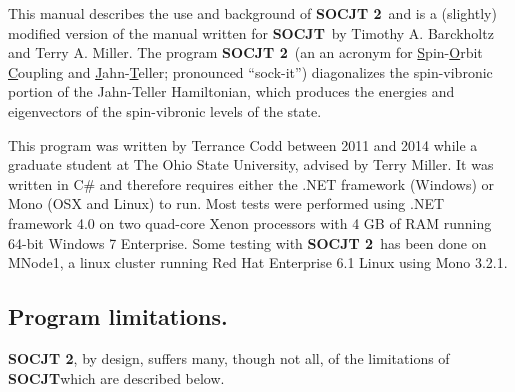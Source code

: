 \documentclass{article}
\newcommand{\ul}{\underline }
\newcommand{\socjttwo}{{\bf SOCJT 2}}
\newcommand{\socjt}{{\bf SOCJT}}
\newcommand{\socrt}{{\bf SOCRT}}
\begin{document}
This manual describes the use and background of \socjttwo\ and is a (slightly) modified version of the manual written for \socjt\ by Timothy A. Barckholtz and Terry A. Miller.
The program \socjttwo\ (an an acronym for {\ul S}pin-{\ul O}rbit {\ul C}oupling
and {\ul J}ahn-{\ul T}eller; pronounced ``sock-it'') diagonalizes the
spin-vibronic portion of the Jahn-Teller Hamiltonian, which produces
the energies and eigenvectors of the spin-vibronic levels of the
state.

\begin{comment}
Besides diagonalizing the spin-vibronic Hamiltonian, the programs
\socjt\ and \socrt\ calculate several properties of the system. All of
these properties are detailed later in section \ref{section:output}.
One of the most important items calculated by \socjt\ is the relative
intensities of the vibronic transitions involved in an electronic
transition to and from the degenerate state. These calculations assume
diagonal Franck-Condon factors, and only the intensities of
progressions of the Jahn-Teller active modes are computed. In the main
\socjt\ and \socrt\ programs, it is assumed that the non-Jahn-Teller
active state involved in the electronic transition is a singly
degenerate or non-Jahn-Teller active degenerate state.
\end{comment}

This program was written by Terrance Codd between 2011 and 2014 while
a graduate student at The Ohio State University, advised by Terry
Miller. It was written in C\# and therefore requires either the .NET framework (Windows) or Mono (OSX and Linux) to run.  Most tests were performed using .NET framework 4.0 on two quad-core Xenon processors with 4 GB of RAM running 64-bit Windows 7 Enterprise.  Some testing with \socjttwo\ has been done on MNode1, a linux cluster running Red Hat Enterprise 6.1 Linux using Mono 3.2.1.
\begin{comment}
A version for the Cray
operating system is available upon request, as is the source code for
the DOS versions. This program should be cited as: Barckholtz, T. A.;
Miller, T. A.  {\it Int. Rev. Phys. Chem.}, {\bf 1998}, {\it 17},
435-524.
\end{comment}

\subsection{Program limitations.} \label{section:limitations}
\socjttwo, by design, suffers many, though not all, of the limitations of \socjt which are described below.
\end{document}

